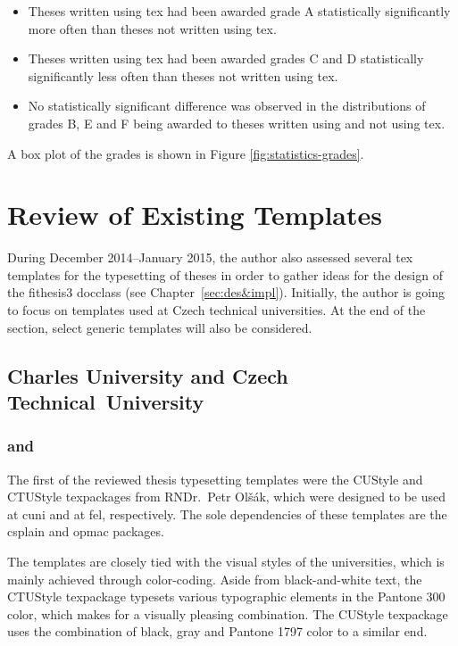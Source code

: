 \documentclass[12pt,twoside,color,table]%
  {fithesis3/fithesis3/fithesis3} %
\begin{document}
  \begin{itemize}
    \item Theses written using \gls{tex} had been awarded grade A
      statistically significantly more often than theses not
      written using \gls{tex}.
    \item Theses written using \gls{tex} had been awarded grades C
      and D statistically significantly less often than theses not
      written using \gls{tex}.
    \item No statistically significant difference was observed in
      the distributions of grades B, E and F being awarded to
      theses written using and not using \gls{tex}.
  \end{itemize}
  A box plot of the grades is shown in Figure
  \ref{fig:statistics-grades}.

\chapter{Review of Existing Templates}\label{sec:review}
During December 2014--January 2015, the author also assessed
several \gls{tex} templates for the typesetting of theses in order
to gather ideas for the design of the \textsf{fithesis3}
\gls{docclass} (see Chapter~\ref{sec:des&impl}). Initially, the
author is going to focus on templates used at Czech technical
universities. At the end of the section, select generic templates
will also be considered.

  \section{Charles University and Czech Technical~University}
  \subsection{ and }
  \label{sec:ctu&custyle}
  The first of the reviewed thesis typesetting templates were the
  \textsf{CUStyle} \cite{custyle} and \textsf{CTUStyle}
  \cite{ctustyle} \glspl{texpackage} from RNDr.\ Petr Olšák,
  which were designed to be used at \gls{cuni} and at \gls{fel},
  respectively. The sole dependencies of these templates are the
  \gls{csplain} and \gls{opmac} packages.

  The templates are closely tied with the visual styles of the
  universities, which is mainly achieved through color-coding.
  Aside from black-and-white text, the \textsf{CTUStyle}
  \gls{texpackage} typesets various typographic elements in the
   Pantone 300 color, which makes for a
  visually pleasing combination. The \textsf{CUStyle}
  \gls{texpackage} uses the combination of black, gray and
   Pantone 1797 color to a similar end. 
\end{document}
